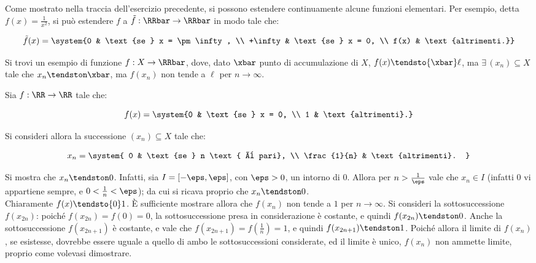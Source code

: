 \documentclass[11pt]{article}
\begin{document}
	\begin{remark} Come mostrato nella traccia dell'esercizio precedente,
		si possono estendere continuamente alcune funzioni elementari.
		Per esempio, detta $f(x) = \frac{1}{x^2}$, si può estendere $f$
		a $\tilde f : \RRbar \to \RRbar$ in modo tale che:
		
		\[ \tilde f(x) = \system {0 & \text{se } x = \pm \infty, \\ +\infty & \text{se } x = 0, \\ f(x) & \text{altrimenti.}} \]
	\end{remark}

	
	\begin{exercise}
		Si trovi un esempio di funzione $f : X \to \RRbar$, dove, dato $\xbar$ punto
		di accumulazione di $X$, $f(x) \tendsto{\xbar} \ell$, ma
		$\exists \, (x_n) \subseteq X$ tale che $x_n \tendston \xbar$, ma
		$f(x_n)$ non tende a $\ell$ per $n \to \infty$.
	\end{exercise}

	\begin{solution}
		Sia $f : \RR \to \RR$ tale che:
		
		\[ f(x) = \system{0 & \text{se } x = 0, \\ 1 & \text{altrimenti}.}\]
		
		Si consideri allora la successione $(x_n) \subseteq X$ tale che:
		
		\[ x_n = \system{ 0 & \text{se } n \text{ è pari}, \\ \frac{1}{n} & \text{altrimenti}. } \]
		
		Si mostra che $x_n \tendston 0$. Infatti, sia $I = [-\eps, \eps]$, con $\eps > 0$, un intorno di $0$.
		Allora per $n > \frac{1}{\eps}$ vale che $x_n \in I$ (infatti $0$ vi appartiene sempre, e $0 < \frac{1}{n} < \eps$);
		da cui si ricava proprio che $x_n \tendston 0$. \\
		
		Chiaramente $f(x) \tendsto{0} 1$. È sufficiente mostrare allora che $f(x_n)$ non tende a $1$ per
		$n \to \infty$. Si consideri la sottosuccessione $f(x_{2n})$: poiché $f(x_{2n}) = f(0) = 0$, la
		sottosuccessione presa in considerazione è costante, e quindi $f(x_{2n}) \tendston 0$.
		Anche la sottosuccessione $f(x_{2n + 1})$ è costante, e vale che $f(x_{2n + 1}) = f(\frac{1}{n}) = 1$,
		e quindi $f(x_{2n+1}) \tendston 1$. Poiché allora il limite di $f(x_n)$, se esistesse, dovrebbe essere
		uguale a quello di ambo le sottosuccessioni considerate, ed il limite è unico, $f(x_n)$ non ammette
		limite, proprio come volevasi dimostrare.
	\end{solution}
\end{document}
